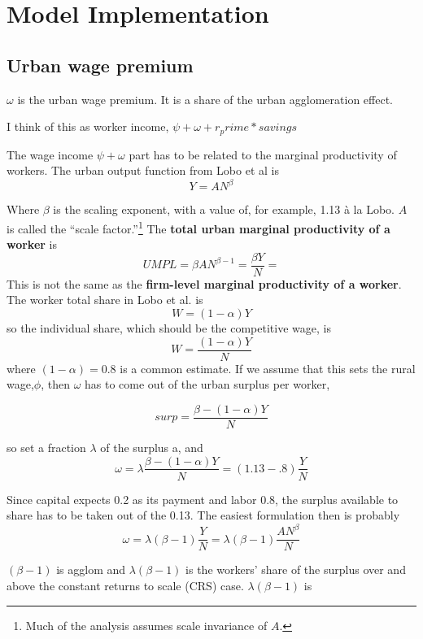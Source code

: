 \chapter[Model Implementation]{Model Implementation}
\label{appendix-model-implementation}

\section{Urban wage premium}

$\omega$ is the urban wage premium. It is a share of the urban agglomeration effect. 

I think of this as worker income, $\psi + \omega + r_prime*savings$ 

The wage income  $\psi + \omega$ part has to be related to the marginal productivity of workers. The urban output function from Lobo et al \cite{loboUrbanScalingProduction2013} is  
\begin{equation}Y=AN^\beta\label{LoboEqn2}\end{equation}

Where $\beta$  is the scaling exponent, with a value of,  for example, 1.13  \`a la 
Lobo. $A$ is called the ``scale factor.''\footnote{Much of the analysis assumes scale invariance of  $A$.}  The \textbf{total urban marginal productivity of a worker} is  
\[UMPL=\beta AN^{\beta-1}=\frac{\beta Y}{N} =\]
This is not the same as the \textbf{firm-level marginal productivity of a worker}. The worker total share in Lobo et al. is \[W= (1-\alpha)Y \] 
so the individual share, which should be the competitive wage, is
\[W= \frac{(1-\alpha)Y}{N} \] 
where $(1-\alpha)=0.8$ is a common estimate. If we assume that this sets the rural wage,$\phi$, then $\omega$ has to come out of the  urban surplus per worker,

\[surp= \frac{\beta -(1-\alpha)Y}{N} \] 

 so set a fraction $\lambda$ of the surplus a, and 
 \[\omega= \lambda\frac{\beta -(1-\alpha)Y}{N}= (1.13-.8) \frac{Y}{N} \] 

 Since capital expects 0.2 as its payment and labor 0.8, the surplus available to share has to be taken out of the 0.13. The easiest formulation then is probably 
 \[\omega= \lambda(\beta -1) \frac{Y}{N} =\lambda(\beta -1) \frac{AN^\beta}{N} \] 
 

$(\beta -1)$ is agglom and  $\lambda(\beta -1)$ is the workers' share of the surplus over and above the \gls{constant returns to scale} (CRS) case.   $\lambda(\beta -1)$ is 


